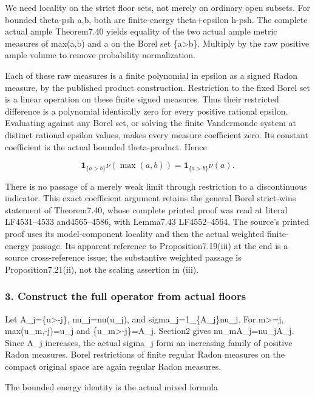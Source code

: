 \documentclass[
  10pt,
]{article}
\begin{document}
We need locality on the strict floor sets, not merely on ordinary open
subsets. For bounded theta-psh a,b, both are finite-energy theta+epsilon
h-psh. The complete actual ample Theorem7.40 yields equality of the two
actual ample metric measures of max(a,b) and a on the Borel set
\{a\textgreater b\}. Multiply by the raw positive ample volume to remove
probability normalization.

Each of these raw measures is a finite polynomial in epsilon as a signed
Radon measure, by the published product construction. Restriction to the
fixed Borel set is a linear operation on these finite signed measures.
Thus their restricted difference is a polynomial identically zero for
every positive rational epsilon. Evaluating against any Borel set, or
solving the finite Vandermonde system at distinct rational epsilon
values, makes every measure coefficient zero. Its constant coefficient
is the actual bounded theta-product. Hence

\[\mathbf1_{\{a>b\}}\nu(\max(a,b))=
\mathbf1_{\{a>b\}}\nu(a).\]

There is no passage of a merely weak limit through restriction to a
discontinuous indicator. This exact coefficient argument retains the
general Borel strict-wins statement of Theorem7.40, whose complete
printed proof was read at literal LF4531--4533 and4565--4586, with
Lemma7.43 LF4552--4564. The source's printed proof uses its
model-component locality and then the actual weighted finite-energy
passage. Its apparent reference to Proposition7.19(iii) at the end is a
source cross-reference issue; the substantive weighted passage is
Proposition7.21(ii), not the scaling assertion in (iii).

\subsubsection{3. Construct the full operator from actual
floors}\label{construct-the-full-operator-from-actual-floors}

Let A\_j=\{u\textgreater-j\}, nu\_j=nu(u\_j), and
sigma\_j=1\_\{A\_j\}nu\_j. For m\textgreater=j, max(u\_m,-j)=u\_j and
\{u\_m\textgreater-j\}=A\_j. Section2 gives
nu\_m\textbar A\_j=nu\_j\textbar A\_j. Since A\_j increases, the actual
sigma\_j form an increasing family of positive Radon measures. Borel
restrictions of finite regular Radon measures on the compact original
space are again regular Radon measures.

The bounded energy identity is the actual mixed formula
\end{document}
